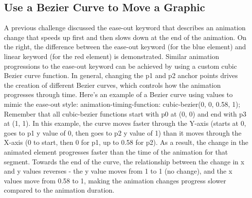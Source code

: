 \documentclass{article}%
\begin{document}
\subsection{Use a Bezier Curve to Move a Graphic}%
\label{subsec:UseaBezierCurvetoMoveaGraphic}%
A previous challenge discussed the ease{-}out keyword that describes an animation change that speeds up first and then slows down at the end of the animation. On the right, the difference between the ease{-}out keyword (for the blue element) and linear keyword (for the red element) is demonstrated. Similar animation progressions to the ease{-}out keyword can be achieved by using a custom cubic Bezier curve function.\newline%
In general, changing the p1 and p2 anchor points drives the creation of different Bezier curves, which controls how the animation progresses through time. Here's an example of a Bezier curve using values to mimic the ease{-}out style:\newline%
animation{-}timing{-}function: cubic{-}bezier(0, 0, 0.58, 1);\newline%
Remember that all cubic{-}bezier functions start with p0 at (0, 0) and end with p3 at (1, 1). In this example, the curve moves faster through the Y{-}axis (starts at 0, goes to p1 y value of 0, then goes to p2 y value of 1) than it moves through the X{-}axis (0 to start, then 0 for p1, up to 0.58 for p2). As a result, the change in the animated element progresses faster than the time of the animation for that segment. Towards the end of the curve, the relationship between the change in x and y values reverses {-} the y value moves from 1 to 1 (no change), and the x values move from 0.58 to 1, making the animation changes progress slower compared to the animation duration.\newline%

%
\end{document}
